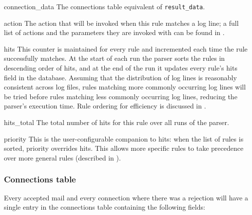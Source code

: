 \begin{eqlist}
    \item [connection\_data] The connections table equivalent of
        \texttt{result\_data}.

    \item [action] The action that will be invoked when this rule matches a
        log line; a full list of actions and the parameters they are
        invoked with can be found in .

    \item [hits] This counter is maintained for every rule and incremented
        each time the rule successfully matches.  At the start of each run
        the parser sorts the rules in descending order of hits, and at the
        end of the run it updates every rule's hits field in the database.
        Assuming that the distribution of log lines is reasonably
        consistent across log files, rules matching more commonly occurring
        log lines will be tried before rules matching less commonly
        occurring log lines, reducing the parser's execution time.  Rule
        ordering for efficiency is discussed in .

    \item [hits\_total] The total number of hits for this rule over all
        runs of the parser.

    \item [priority] This is the user-configurable companion to hits: when
        the list of rules is sorted, priority overrides hits.  This allows
        more specific rules to take precedence over more general rules
        (described in ).


\end{eqlist}


\subsubsection{Connections table}

\label{connections table}

Every accepted mail and every connection where there was a rejection will
have a single entry in the connections table containing the following
fields:


